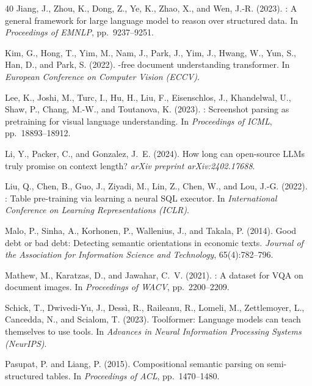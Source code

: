 \documentclass[11pt]{article}
\begin{document}
\begin{thebibliography}{40}
Jiang, J., Zhou, K., Dong, Z., Ye, K., Zhao, X., and Wen, J.-R. (2023).
: A general framework for large language model to reason
  over structured data.
\newblock In \emph{Proceedings of EMNLP}, pp.~9237--9251.

Kim, G., Hong, T., Yim, M., Nam, J., Park, J., Yim, J., Hwang, W.,
  Yun, S., Han, D., and Park, S. (2022).
-free document understanding transformer.
\newblock In \emph{European Conference on Computer Vision (ECCV)}.

Lee, K., Joshi, M., Turc, I., Hu, H., Liu, F., Eisenschlos, J.,
  Khandelwal, U., Shaw, P., Chang, M.-W., and Toutanova, K. (2023).
: Screenshot parsing as pretraining for visual language
  understanding.
\newblock In \emph{Proceedings of ICML}, pp.~18893--18912.

Li, Y., Packer, C., and Gonzalez, J.~E. (2024).
\newblock How long can open-source {LLMs} truly promise on context length?
\newblock \emph{arXiv preprint arXiv:2402.17688}.

Liu, Q., Chen, B., Guo, J., Ziyadi, M., Lin, Z., Chen, W., and
  Lou, J.-G. (2022).
: Table pre-training via learning a neural {SQL} executor.
\newblock In \emph{International Conference on Learning Representations (ICLR)}.

Malo, P., Sinha, A., Korhonen, P., Wallenius, J., and Takala, P. (2014).
\newblock Good debt or bad debt: Detecting semantic orientations in economic
  texts.
\newblock \emph{Journal of the Association for Information Science and
  Technology}, 65(4):782--796.

Mathew, M., Karatzas, D., and Jawahar, C.~V. (2021).
: A dataset for {VQA} on document images.
\newblock In \emph{Proceedings of WACV}, pp.~2200--2209.

Schick, T., Dwivedi-Yu, J., Dess\`i, R., Raileanu, R., Lomeli, M.,
  Zettlemoyer, L., Cancedda, N., and Scialom, T. (2023).
\newblock Toolformer: Language models can teach themselves to use tools.
\newblock In \emph{Advances in Neural Information Processing Systems (NeurIPS)}.

Pasupat, P. and Liang, P. (2015).
\newblock Compositional semantic parsing on semi-structured tables.
\newblock In \emph{Proceedings of ACL}, pp.~1470--1480.


\end{thebibliography}
\end{document}
